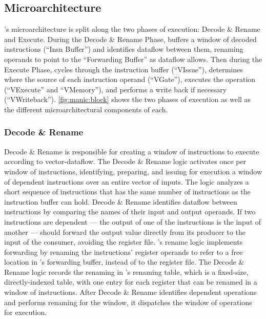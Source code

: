 \subsection{Microarchitecture}
\label{manic:manic:uarch}
\manic's microarchitecture is split along the two phases of execution: Decode \& Rename and Execute.
% 
During the Decode \& Rename Phase, \manic buffers a window of decoded instructions (``Insn Buffer'') and identifies dataflow between them, renaming operands to point to the ``Forwarding Buffer'' as dataflow allows.
% 
Then during the Execute Phase, \manic cycles through the instruction buffer (``VIssue''), determines where the source of each instruction operand (``VGate''), executes the operation (``VExecute'' and ``VMemory''), and performs a write back if necessary (``VWriteback'').
%
\autoref{fig:manic:block} shows the two phases of execution as well as the different microarchitectural components of each.

\figMANICBlock

\subsubsection{Decode \& Rename}
Decode \& Rename is responsible for creating a window of
instructions to execute according to vector-dataflow.
%
The Decode \& Rename logic activates once per window of instructions, identifying,
preparing, and issuing for execution a window of dependent instructions over an entire vector of inputs.
%
%
The logic analyzes a short sequence of instructions that has the same
number of instructions as the instruction buffer can hold. 
%
Decode \& Rename identifies dataflow between instructions by comparing the names
of their input and output operands. 
%
If two instructions are dependent --- the output of one of the instructions is 
the input of another ---  \manic should forward the output value directly from
its producer to the input of the consumer, avoiding the register file.
\manic's rename logic implements forwarding by renaming the instructions' register operands 
to refer to a free location in \manic's forwarding
buffer, instead of to the register file. 
%
The Decode \& Rename logic records the renaming in \manic's renaming table, which is a
fixed-size, directly-indexed table, with one entry for each register that can
be renamed in a window of instructions.
%
After Decode \& Rename identifies dependent operations and performs renaming for the window, it dispatches the window of operations for execution.


